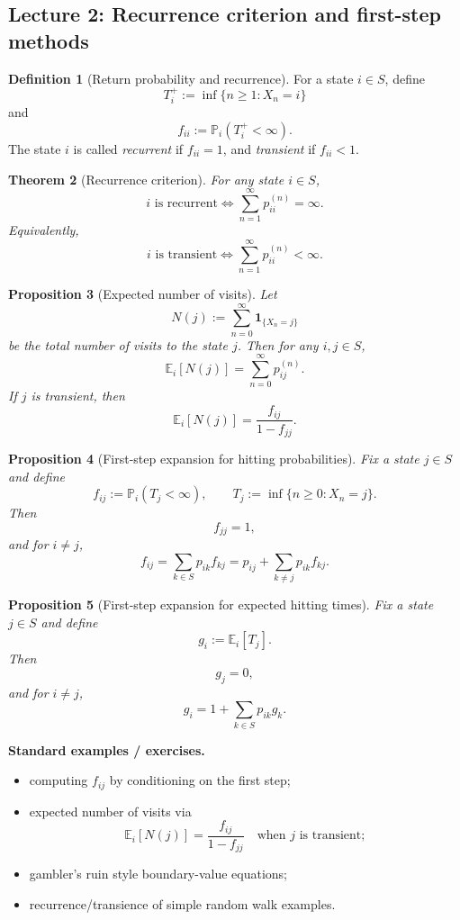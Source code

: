 \documentclass[11pt]{article}
\newtheorem{theorem}{Theorem}[section]
\newtheorem{proposition}[theorem]{Proposition}
\theoremstyle{definition}
\newtheorem{definition}[theorem]{Definition}
\begin{document}
\subsection{Lecture 2: Recurrence criterion and first-step methods}

\begin{definition}[Return probability and recurrence]
For a state $i\in S$, define
\[
T_i^+:=\inf\{n\ge 1:X_n=i\}
\]
and
\[
f_{ii}:=\mathbb P_i(T_i^+<\infty).
\]
The state $i$ is called \emph{recurrent} if $f_{ii}=1$, and \emph{transient} if $f_{ii}<1$.
\end{definition}

\begin{theorem}[Recurrence criterion]
For any state $i\in S$,
\[
i \text{ is recurrent}
\iff
\sum_{n=1}^{\infty} p_{ii}^{(n)}=\infty.
\]
Equivalently,
\[
i \text{ is transient}
\iff
\sum_{n=1}^{\infty} p_{ii}^{(n)}<\infty.
\]
\end{theorem}

\begin{proposition}[Expected number of visits]
Let
\[
N(j):=\sum_{n=0}^{\infty}\mathbf 1_{\{X_n=j\}}
\]
be the total number of visits to the state $j$. Then for any $i,j\in S$,
\[
\mathbb E_i[N(j)] = \sum_{n=0}^{\infty} p_{ij}^{(n)}.
\]
If $j$ is transient, then
\[
\mathbb E_i[N(j)] = \frac{f_{ij}}{1-f_{jj}}.
\]
\end{proposition}

\begin{proposition}[First-step expansion for hitting probabilities]
Fix a state $j\in S$ and define
\[
f_{ij}:=\mathbb P_i(T_j<\infty),
\qquad T_j:=\inf\{n\ge 0:X_n=j\}.
\]
Then
\[
f_{jj}=1,
\]
and for $i\neq j$,
\[
f_{ij}=\sum_{k\in S} p_{ik}f_{kj}
= p_{ij}+\sum_{k\neq j} p_{ik}f_{kj}.
\]
\end{proposition}

\begin{proposition}[First-step expansion for expected hitting times]
Fix a state $j\in S$ and define
\[
g_i:=\mathbb E_i[T_j].
\]
Then
\[
g_j=0,
\]
and for $i\neq j$,
\[
g_i = 1 + \sum_{k\in S} p_{ik}g_k.
\]
\end{proposition}

\textbf{Standard examples / exercises.}
\begin{itemize}[leftmargin=2em]
    \item computing $f_{ij}$ by conditioning on the first step;
    \item expected number of visits via
    \[
    \mathbb E_i[N(j)] = \frac{f_{ij}}{1-f_{jj}}
    \quad\text{when } j\text{ is transient};
    \]
    \item gambler's ruin style boundary-value equations;
    \item recurrence/transience of simple random walk examples.
\end{itemize}
\end{document}
